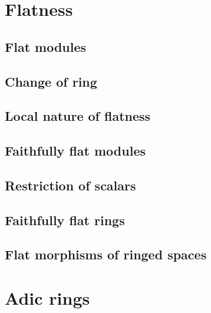     \section{Flatness}
    \label{0-prelim-6}

        \subsection{Flat modules}
        \label{0-prelim-6.1}
        

        \subsection{Change of ring}
        \label{0-prelim-6.2}
        

        \subsection{Local nature of flatness}
        \label{0-prelim-6.3}
        

        \subsection{Faithfully flat modules}
        \label{0-prelim-6.4}
        

        \subsection{Restriction of scalars}
        \label{0-prelim-6.5}
        

        \subsection{Faithfully flat rings}
        \label{0-prelim-6.6}
        

        \subsection{Flat morphisms of ringed spaces}
        \label{0-prelim-6.7}
        

    \section{Adic rings}
    \label{0-prelim-7}

